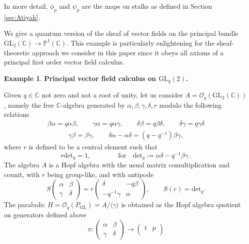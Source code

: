 \documentclass{article}
\theoremstyle{definition}
\newtheorem{example}[thm]{Example}
\newcommand{\C}{{\mathbb{C}}}
\newcommand{\bP}{{\mathbb{P}}}
\newcommand{\lra}{{\longrightarrow}}
\begin{document}
{In more detail, $\phi_p$ and $\psi_p$ are the maps on stalks as defined in Section \ref{sec:Atiyah}.







We give a quantum version of the sheaf of vector fields on the principal bundle
$\mathrm{GL}_2(\C) \lra \bP^1(\C)$. This example is particularly enlightening for the sheaf-theoretic approach we consider in this paper since it obeys all axioms of a principal first order vector field calculus.


\begin{example} {\bf Principal vector field calculus on $\mathrm{GL}_q(2)$.}
	
	
	Given $q\in\mathbb{C}$ not zero and not a root of unity, let us consider $A=\mathcal{O}_q(\mathrm{GL}_2(\mathbb{C}))$, namely the free $\mathbb{C}$-algebra generated by $\alpha,\beta,\gamma,\delta,r$ modulo the following relations
	\begin{align*}
		\beta\alpha
		=q\alpha\beta,\qquad
		\gamma\alpha
		=q\alpha\gamma,\qquad
		\delta\beta
		=q\beta\delta,\qquad
		\delta\gamma
		=q\gamma\delta
	\end{align*}
	\begin{align*}
		\gamma\beta
		=\beta\gamma,\qquad
		\delta\alpha-\alpha\delta
		=(q-q^{-1})\beta\gamma,
	\end{align*}
	where $r$ is defined to be a central element such that 
	$$
	r\mathrm{det}_q=1,\qquad\qquad
	\text{for}\quad\mathrm{det}_q:=\alpha\delta-q^{-1}\beta\gamma\,.
	$$
	The algebra $A$ is a Hopf algebra with the usual matrix comultiplication and counit, with $r$ being group-like, and with antipode
	$$
	S\begin{pmatrix}
		\alpha & \beta\\
		\gamma & \delta
	\end{pmatrix}=r\begin{pmatrix}
		\delta & -q\beta\\
		-q^{-1}\gamma & \alpha
	\end{pmatrix},\qquad
	S(r)=\mathrm{det}_q.
	$$
	The parabolic $H=\mathcal{O}_q(P_\mathrm{GL})=A/\langle\gamma\rangle$ is obtained as the Hopf algebra quotient on generators defined above
	$$
	\pi\colon\begin{pmatrix}
		\alpha & \beta\\
		\gamma & \delta
	\end{pmatrix}\to\begin{pmatrix}
		t & p\\

\end{pmatrix}$$
\end{example}}
\end{document}
